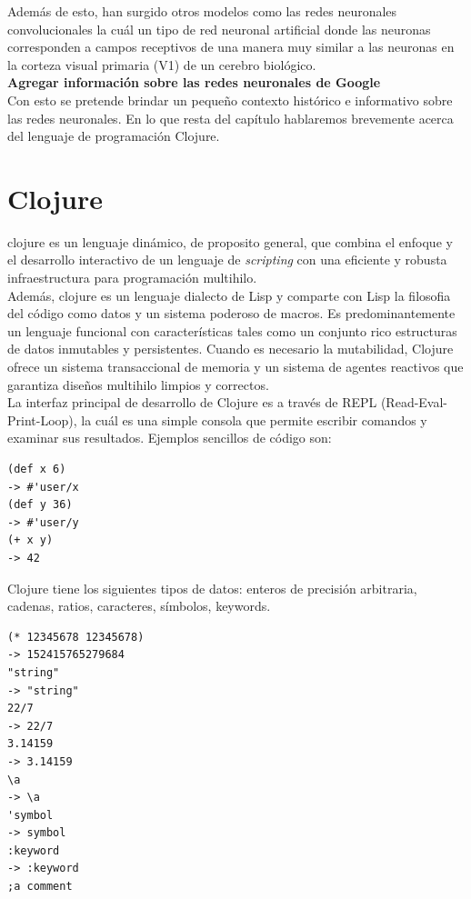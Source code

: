 Además de esto, han surgido otros modelos como las redes neuronales
convolucionales \cite{hubel1968receptive, fukushima1980neocognitron,
  behnke2003hierarchical, lecun1998gradient, graupe1988applications}
la cuál un tipo de red neuronal artificial donde las neuronas
corresponden a campos receptivos de una manera muy similar a las
neuronas en la corteza visual primaria (V1) de un cerebro biológico.\\

\textbf{Agregar información sobre las redes neuronales de Google}\\

Con esto se pretende brindar un pequeño contexto histórico e
informativo sobre las redes neuronales. En lo que resta del capítulo
hablaremos brevemente acerca del lenguaje de programación Clojure.

\section{Clojure}

\gls{clojure} es un lenguaje dinámico, de proposito general, que combina el
enfoque y el desarrollo interactivo de un lenguaje de
\textsl{scripting} con una eficiente y robusta infraestructura para
programación multihilo.\\

Además, \gls{clojure} es un lenguaje dialecto de Lisp y comparte con
Lisp la filosofia del código como datos y un sistema poderoso de
macros. Es predominantemente un lenguaje funcional con características
tales como un conjunto rico estructuras de datos inmutables y
persistentes. Cuando es necesario la mutabilidad, Clojure ofrece un
sistema transaccional de memoria y un sistema de agentes reactivos que
garantiza diseños multihilo limpios y correctos.\\

La interfaz principal de desarrollo de Clojure es a través de REPL
(Read-Eval-Print-Loop), la cuál es una simple consola que permite
escribir comandos y examinar sus resultados. Ejemplos sencillos de
código son:

\begin{verbatim}
(def x 6)
-> #'user/x
(def y 36)
-> #'user/y
(+ x y)
-> 42
\end{verbatim}

Clojure tiene los siguientes tipos de datos: enteros de precisión
arbitraria, cadenas, ratios, caracteres, símbolos, keywords.

\begin{verbatim}
(* 12345678 12345678)
-> 152415765279684
"string"
-> "string"
22/7
-> 22/7
3.14159
-> 3.14159
\a
-> \a
'symbol
-> symbol
:keyword
-> :keyword
;a comment
\end{verbatim}

